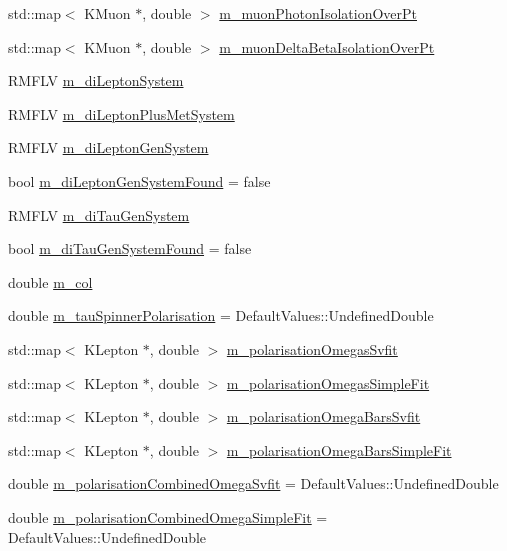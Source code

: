 \begin{DoxyCompactItemize}
std::map$<$ KMuon $\ast$, double $>$ \hyperlink{classHttProduct_aedf7aad859164dc7ec217ee3586d4d8b}{m\_\-muonPhotonIsolationOverPt}
\item 
std::map$<$ KMuon $\ast$, double $>$ \hyperlink{classHttProduct_a3cdbe21e10c8bd9e790732191ecd5776}{m\_\-muonDeltaBetaIsolationOverPt}
\item 
RMFLV \hyperlink{classHttProduct_a507d922119a2091de4885740846c3b6b}{m\_\-diLeptonSystem}
\item 
RMFLV \hyperlink{classHttProduct_aae54f2c0092ba8aea1b631f5ba8ca813}{m\_\-diLeptonPlusMetSystem}
\item 
RMFLV \hyperlink{classHttProduct_ae5c2946262b801bfb4c754689bbe5fbf}{m\_\-diLeptonGenSystem}
\item 
bool \hyperlink{classHttProduct_a6a324cf345b28109cae9dcee49c95b2e}{m\_\-diLeptonGenSystemFound} = false
\item 
RMFLV \hyperlink{classHttProduct_aeff39416edd99d269ce0ca52f551f252}{m\_\-diTauGenSystem}
\item 
bool \hyperlink{classHttProduct_a6cccf4c815d41dfa8fd2956960d3794b}{m\_\-diTauGenSystemFound} = false
\item 
double \hyperlink{classHttProduct_a215a81b1db6f7bd11ff6d0ee0178386d}{m\_\-col}
\item 
double \hyperlink{classHttProduct_a07f77401cf50bb193347cbec02ebae05}{m\_\-tauSpinnerPolarisation} = DefaultValues::UndefinedDouble
\item 
std::map$<$ KLepton $\ast$, double $>$ \hyperlink{classHttProduct_ad23306a6f236a70a45aed2d285e32750}{m\_\-polarisationOmegasSvfit}
\item 
std::map$<$ KLepton $\ast$, double $>$ \hyperlink{classHttProduct_a5d985659a837ce0cd45fd247c8d28827}{m\_\-polarisationOmegasSimpleFit}
\item 
std::map$<$ KLepton $\ast$, double $>$ \hyperlink{classHttProduct_a8eda87274c5559af86ec2fac290f8aad}{m\_\-polarisationOmegaBarsSvfit}
\item 
std::map$<$ KLepton $\ast$, double $>$ \hyperlink{classHttProduct_a2c33c1585a230077b24bc0050ccec598}{m\_\-polarisationOmegaBarsSimpleFit}
\item 
double \hyperlink{classHttProduct_a829ebf0e411d8e2ad1410ccff493db0e}{m\_\-polarisationCombinedOmegaSvfit} = DefaultValues::UndefinedDouble
\item 
double \hyperlink{classHttProduct_adf20d7ef58760c4a6ded6a6547315b5c}{m\_\-polarisationCombinedOmegaSimpleFit} = DefaultValues::UndefinedDouble
\item 

\end{DoxyCompactItemize}
